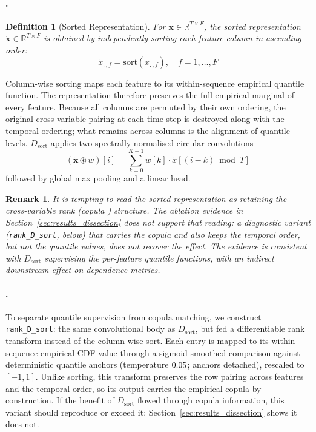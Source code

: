\documentclass[preprint,12pt]{elsarticle}
\makeatletter
\let\ElsParagraph\paragraph
\def\StripRunInStop#1.\StripRunInMark#2\StripRunInEnd{#1}
\let\StripRunInMark\@empty
\renewcommand\paragraph[1]{\ElsParagraph{\StripRunInStop#1\StripRunInMark.\StripRunInMark\StripRunInEnd}}
\newtheorem{remark}{Remark}
\newtheorem{definition}{Definition}
\newcommand{\R}{\mathbb{R}}
\newcommand{\Dsort}{D_{\mathrm{sort}}}
\newcommand{\sort}{\mathrm{sort}}
\makeatother
\begin{document}
\paragraph{$\Dsort$: Sorted-Representation Discriminator.}
\begin{definition}[Sorted Representation]
For $\mathbf{x} \in \R^{T\times F}$, the sorted representation
$\check{\mathbf{x}} \in \R^{T\times F}$ is obtained by independently
sorting each feature column in ascending order:
\begin{equation}
  \check{x}_{:,f} = \sort\!\left(x_{:,f}\right), \quad f = 1,\ldots,F
  \label{eq:sorted}
\end{equation}
\end{definition}
Column-wise sorting maps each feature to its within-sequence empirical
quantile function.  The representation therefore preserves the full
empirical marginal of every feature.  Because all columns are permuted
by their own ordering, the original cross-variable pairing at each time
step is destroyed along with the temporal ordering; what remains across
columns is the alignment of quantile levels.  $\Dsort$ applies two
spectrally normalised circular convolutions
\begin{equation}
  (\check{\mathbf{x}} \circledast w)[i]
    = \sum_{k=0}^{K-1} w[k]\cdot \check{x}[(i-k) \bmod T]
  \label{eq:circ_conv}
\end{equation}
followed by global max pooling and a linear head.

\begin{remark}
It is tempting to read the sorted representation as retaining the
cross-variable rank (copula \cite{nelsen2006copulas}) structure.  The
ablation evidence in Section~\ref{sec:results_dissection} does not
support that reading: a diagnostic variant (\texttt{rank\_D\_sort},
below) that carries the copula and also keeps the temporal order, but
not the quantile values, does not recover the effect.  The evidence is
consistent with $\Dsort$ supervising the per-feature quantile functions,
with an indirect downstream effect on dependence metrics.
\end{remark}

\paragraph{Rank-transformed variant (mechanism probe).}
To separate quantile supervision from copula matching, we construct
\texttt{rank\_D\_sort}: the same convolutional body as $\Dsort$, but fed
a differentiable rank transform instead of the column-wise sort.  Each
entry is mapped to its within-sequence empirical CDF value through a
sigmoid-smoothed comparison against \codeRankAnchors{} deterministic
quantile anchors (temperature $0.05$; anchors detached), rescaled to $[-1,1]$.  Unlike
sorting, this transform preserves the row pairing across features and the
temporal order, so
its output carries the empirical copula by construction.  If the benefit
of $\Dsort$ flowed through copula information, this variant should
reproduce or exceed it; Section~\ref{sec:results_dissection} shows it
does not.
\end{document}
